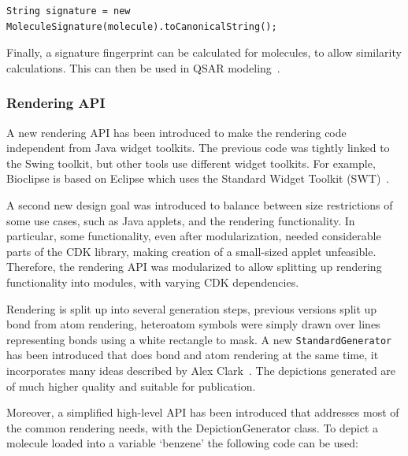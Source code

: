 \documentclass[doublespacing]{bmcart}
\begin{document}
\vspace{0.2cm}
\begin{verbatim}
String signature = new MoleculeSignature(molecule).toCanonicalString();
\end{verbatim}
\vspace{0.2cm}

  Finally, a signature fingerprint can be calculated for molecules, to allow
  similarity calculations. This can then be used in QSAR modeling~\cite{Alvarsson2016,
  signaturefingerprints,Spjuth2011DS,Moghadam2015,Alvarsson2014,Spjuth2012OS,Norinder2013}.

  \subsubsection*{Rendering API}

  A new rendering API has been introduced to make the rendering code independent
  from Java widget toolkits. The previous code was tightly linked to the Swing
  toolkit, but other tools use different widget toolkits. For example, Bioclipse
  is based on Eclipse which uses the Standard Widget Toolkit (SWT)~\cite{spjuth2007bioclipse}.
  
  A second new design goal was introduced to balance between size restrictions
  of some use cases, such as Java applets, and the rendering functionality. In
  particular, some functionality, even after modularization, needed considerable
  parts of the CDK library, making creation of a small-sized applet unfeasible.
  Therefore, the rendering API was modularized to allow splitting up rendering
  functionality into modules, with varying CDK dependencies.

  Rendering is split up into several generation steps, previous versions split
  up bond from atom rendering, heteroatom symbols were simply drawn over lines
  representing bonds using a white rectangle to mask. A new \texttt{StandardGenerator}
  has been introduced that does bond and atom rendering at the same time, it incorporates
  many ideas described by Alex Clark~\cite{Clark10,Clark13}. The depictions generated are of much
  higher quality and suitable for publication.

  
  Moreover, a simplified high-level API has been introduced that addresses most of the
  common rendering needs, with the DepictionGenerator class. To depict a molecule
  loaded into a variable `benzene' the following code can be used:
\end{document}
